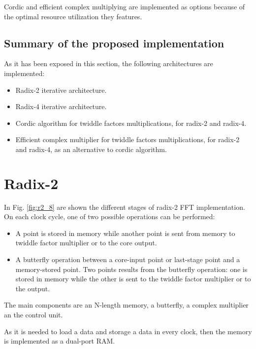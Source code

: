 \documentclass[conference]{IEEEtran}
\begin{document}
Cordic and efficient complex multiplying are implemented as options because of the optimal resource utilization they features.

\subsection{Summary of the proposed implementation}

As it has been exposed in this section, the following architectures are implemented:

\begin{itemize}
  \item Radix-2 iterative architecture.
  \item Radix-4 iterative architecture.
  \item Cordic algorithm for twiddle factors multiplications, for radix-2 and radix-4.
  \item Efficient complex multiplier for twiddle factors multiplications, for radix-2 and radix-4, as an alternative to 
  cordic algorithm.
\end{itemize} 

\section{Radix-2}

In Fig. \ref{fig:r2_8} are shown the different stages of radix-2 FFT implementation.
On each clock cycle, one of two possible operations can be performed:

\begin{itemize}
  \item A point is stored in memory while another point is sent from memory to twiddle factor multiplier or to the core output.
  \item A butterfly operation between a core-input point or last-stage point and a memory-stored point. Two points results from the
  butterfly operation: one is stored in memory while the other is sent to the twiddle factor multiplier or to the output.  
\end{itemize}

The main components are an N-length memory, a butterfly, a complex multiplier an the control unit.

As it is needed to load a data and storage a data in every clock, then the memory is implemented as a dual-port RAM. 
\end{document}
